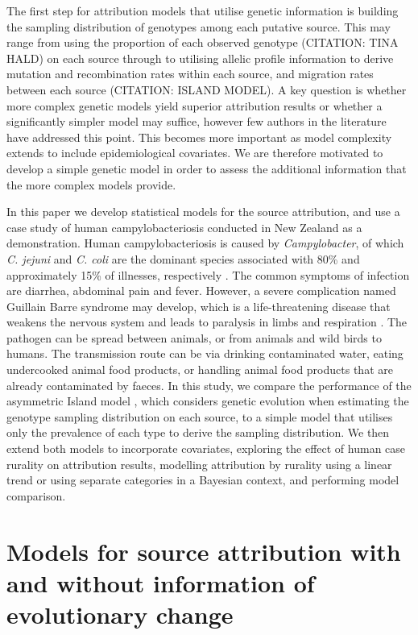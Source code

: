 \documentclass[times, doublespace]{WileyNJD-v2}%
\begin{document}
The first step for attribution models that utilise genetic information is building the sampling distribution of genotypes among each putative source. This may range from using the proportion of each observed genotype (CITATION: TINA HALD) on each source through to utilising allelic profile information to derive mutation and recombination rates within each source, and migration rates between each source (CITATION: ISLAND MODEL). A key question is whether more complex genetic models yield superior attribution results or whether a significantly simpler model may suffice, however few authors in the literature have addressed this point. This becomes more important as model complexity extends to include epidemiological covariates. We are therefore motivated to develop a simple genetic model in order to assess the additional information that the more complex models provide.

In this paper we develop statistical models for the source attribution, and use a case study of human campylobacteriosis conducted in New Zealand \cite{Marsh} as a demonstration. Human campylobacteriosis is caused by \textit{Campylobacter}, of which \textit{C. jejuni} and \textit{C. coli} are the dominant species associated with 80\% and approximately 15\% of illnesses, respectively \cite{Guert}. The common symptoms of infection are diarrhea, abdominal pain and fever. However, a severe complication named Guillain Barre syndrome may develop, which is a life-threatening disease that weakens the nervous system and leads to paralysis in limbs and respiration \cite{Hanha}. The pathogen can be spread between animals, or from animals and wild birds to humans. The transmission route can be via drinking contaminated water, eating undercooked animal food products, or handling animal food products that are already contaminated by faeces. In this study, we compare the performance of the asymmetric Island model \cite{Wilso}, which considers genetic evolution when estimating the genotype sampling distribution on each source, to a simple model that utilises only the prevalence of each type to derive the sampling distribution. We then extend both models to incorporate covariates, exploring the effect of human case rurality on attribution results, modelling attribution by rurality using a linear trend or using separate categories in a Bayesian context, and performing model comparison.

\section{Models for source attribution with and without information of evolutionary change}
\end{document}

